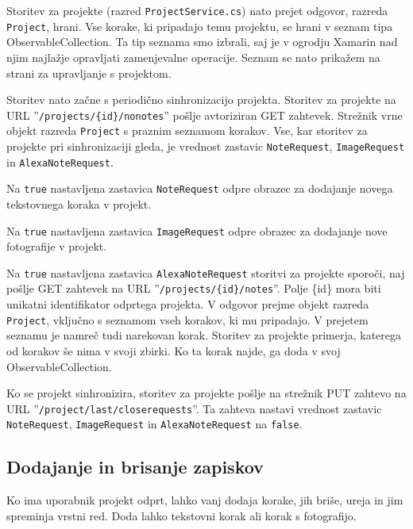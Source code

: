 \documentclass[a4paper, 12pt]{book}
\begin{document}
Storitev za projekte (razred \texttt{ProjectService.cs}) nato prejet odgovor, razreda \texttt{Project}, hrani.
Vse korake, ki pripadajo temu projektu, se hrani v seznam tipa ObservableCollection.
Ta tip seznama smo izbrali, saj je v ogrodju Xamarin nad njim najlažje opravljati zamenjevalne operacije.
Seznam se nato prikažem na strani za upravljanje s projektom.

Storitev nato začne s periodično sinhronizacijo projekta.
Storitev za projekte na URL ''\texttt{/projects/\{id\}/nonotes}'' pošlje avtoriziran GET zahtevek.
Strežnik vrne objekt razreda \texttt{Project} s praznim seznamom korakov.
Vse, kar storitev za projekte pri sinhronizaciji gleda, je vrednost zastavic \texttt{NoteRequest}, \texttt{ImageRequest} in \texttt{AlexaNoteRequest}.

Na \texttt{true} nastavljena zastavica \texttt{NoteRequest} odpre obrazec za dodajanje novega tekstovnega koraka v projekt.

Na \texttt{true} nastavljena zastavica \texttt{ImageRequest} odpre obrazec za dodajanje nove fotografije v projekt.

Na \texttt{true} nastavljena zastavica \texttt{AlexaNoteRequest} storitvi za projekte sporoči, naj pošlje GET zahtevek na URL ''\texttt{/projects/\{id\}/notes}''.
Polje \{id\} mora biti unikatni identifikator odprtega projekta.
V odgovor prejme objekt razreda \texttt{Project}, vključno s seznamom vseh korakov, ki mu pripadajo.
V prejetem seznamu je namreč tudi narekovan korak.
Storitev za projekte primerja, katerega od korakov še nima v svoji zbirki.
Ko ta korak najde, ga doda v svoj ObservableCollection.

Ko se projekt sinhronizira, storitev za projekte pošlje na strežnik PUT zahtevo na URL ''\texttt{/project/last/closerequests}''.
Ta zahteva nastavi vrednost zastavic \texttt{NoteRequest}, \texttt{ImageRequest} in \texttt{AlexaNoteRequest} na \texttt{false}.


\subsection{Dodajanje in brisanje zapiskov}

Ko ima uporabnik projekt odprt, lahko vanj dodaja korake, jih briše, ureja in jim spreminja vrstni red.
Doda lahko tekstovni korak ali korak s fotografijo.
\end{document}
